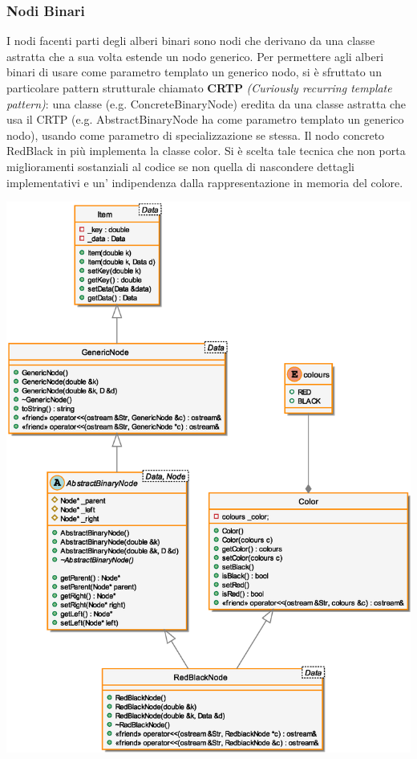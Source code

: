 \subsubsection{Nodi Binari}
\indent I nodi facenti parti degli alberi
binari sono nodi che derivano da una classe astratta che a sua
volta estende un nodo generico.\newline
\indent Per permettere agli alberi binari di usare come parametro
templato un generico nodo, si \`e sfruttato un particolare
pattern strutturale chiamato \textbf{CRTP} \textit{(Curiously recurring 
template pattern)}: una classe (e.g. ConcreteBinaryNode) eredita
da una classe astratta che usa il CRTP (e.g. AbstractBinaryNode ha come parametro templato un generico nodo), usando
come parametro di specializzazione se stessa. Il nodo concreto
RedBlack in pi\`u implementa la classe color. Si \`e scelta tale tecnica che non porta
miglioramenti sostanziali al codice se non quella di nascondere
dettagli implementativi e un' indipendenza dalla rappresentazione in memoria del colore.
\begin{center}
\includegraphics[scale=0.6]{src/rbhash/2img/nodes.eps}
\end{center}
